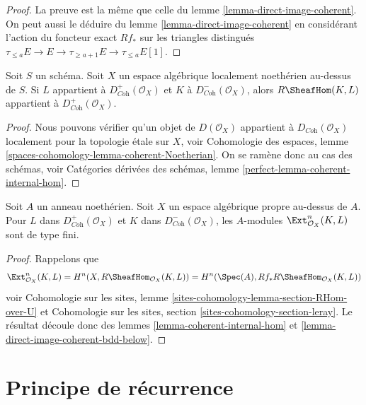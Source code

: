 \begin{proof}
La preuve est la même que celle du
lemme \ref{lemma-direct-image-coherent}.
On peut aussi le déduire du
lemme \ref{lemma-direct-image-coherent}
en considérant l'action du foncteur exact $Rf_*$ sur les
triangles distingués
$\tau_{\leq a}E \to E \to \tau_{\geq a + 1}E \to \tau_{\leq a}E[1]$.
\end{proof}

\begin{lemma}
\label{lemma-coherent-internal-hom}
Soit $S$ un schéma. Soit $X$ un espace algébrique localement noethérien au-dessus de $S$.
Si $L$ appartient à $D^+_{\textit{Coh}}(\mathcal{O}_X)$
et $K$ à $D^-_{\textit{Coh}}(\mathcal{O}_X)$, alors
$R\SheafHom(K, L)$ appartient à $D^+_{\textit{Coh}}(\mathcal{O}_X)$.
\end{lemma}

\begin{proof}
Nous pouvons vérifier qu'un objet de $D(\mathcal{O}_X)$ appartient à
$D_{\textit{Coh}}(\mathcal{O}_X)$ localement pour la topologie étale sur $X$, voir
Cohomologie des espaces, lemme \ref{spaces-cohomology-lemma-coherent-Noetherian}.
On se ramène donc au cas des schémas, voir
Catégories dérivées des schémas, lemme \ref{perfect-lemma-coherent-internal-hom}.
\end{proof}

\begin{lemma}
\label{lemma-ext-finite}
Soit $A$ un anneau noethérien. Soit $X$ un espace algébrique propre au-dessus de $A$.
Pour $L$ dans $D^+_{\textit{Coh}}(\mathcal{O}_X)$ et $K$ dans
$D^-_{\textit{Coh}}(\mathcal{O}_X)$, les $A$-modules
$\Ext_{\mathcal{O}_X}^n(K, L)$ sont de type fini.
\end{lemma}

\begin{proof}
Rappelons que
$$
\Ext_{\mathcal{O}_X}^n(K, L) =
H^n(X, R\SheafHom_{\mathcal{O}_X}(K, L)) =
H^n(\Spec(A), Rf_*R\SheafHom_{\mathcal{O}_X}(K, L))
$$
voir Cohomologie sur les sites, lemme \ref{sites-cohomology-lemma-section-RHom-over-U}
et Cohomologie sur les sites, section \ref{sites-cohomology-section-leray}.
Le résultat découle donc des lemmes \ref{lemma-coherent-internal-hom} et
\ref{lemma-direct-image-coherent-bdd-below}.
\end{proof}




\section{Principe de récurrence}
\label{section-induction}

